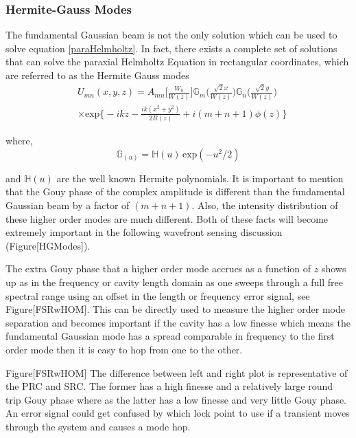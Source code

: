 		\subsubsection{Hermite-Gauss Modes}
		The fundamental Gaussian beam is not the only solution which can be used to solve equation \ref{paraHelmholtz}.  In fact, there exists a complete set of solutions that can solve the paraxial Helmholtz Equation in rectangular coordinates, which are referred to as the Hermite Gauss modes
		\begin{equation}\label{HG}
		\begin{aligned}
		&U_{mn}(x,y,z) = A_{mn}\bigg[ \frac{W_0}{W(z)} \bigg] \mathbb{G}_m\Bigg( \frac{\sqrt{2}x}{W(z)}  \Bigg) \mathbb{G}_n\Bigg( \frac{\sqrt{2}y}{W(z)} \Bigg)\\
		&\times \text{exp} \bigg\{ -ikz - \frac{ik(x^2+y^2)}{2R(z)} + i(m+n+1)\phi(z) \bigg\}
		\end{aligned}
		\end{equation}
		
		where,
		\begin{equation}
		\mathbb{G}_(u) = \mathbb{H}(u) \, \text{exp}(-u^2/2)
		\end{equation}
		
		and $ \mathbb{H}(u)$ are the well known Hermite polynomials.  It is important to mention that the Gouy phase of the complex amplitude is different than the fundamental Gaussian beam by a factor of $(m + n + 1)$.   Also, the intensity distribution of these higher order modes are much different. Both of these facts will become extremely important in the following wavefront sensing discussion (Figure[HGModes]).
		
		The extra Gouy phase that a higher order mode accrues as a function of $z$ shows up as in the frequency or cavity length domain as one sweeps through a full free spectral range using an offset in the length or frequency error signal, see Figure[FSRwHOM].  This  can be directly used to measure the higher order mode separation and becomes important if the cavity has a low finesse which means the fundamental Gaussian mode has a spread comparable in frequency to the first order mode then it is easy to hop from one to the other.
		
		Figure[FSRwHOM] The difference between left and right plot is representative of the PRC and SRC.  The former has a high finesse and a relatively large round trip Gouy phase where as the latter has a low finesse and very little Gouy phase.  An error signal could get confused by which lock point to use if a transient moves through the system and causes a mode hop.
		

